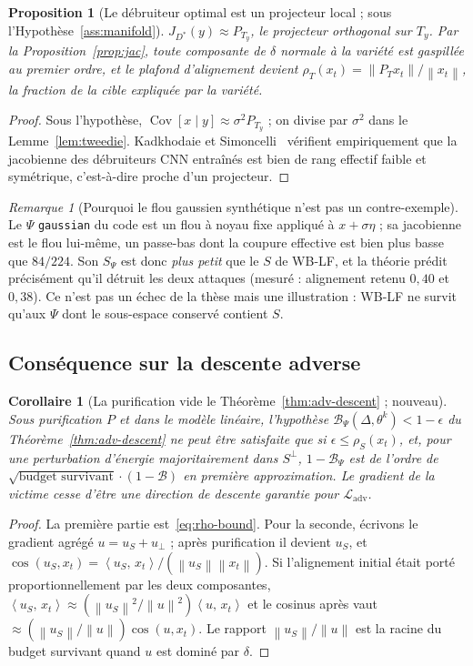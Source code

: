 \documentclass[11pt,a4paper]{article}
\theoremstyle{plain}
\newtheorem{proposition}[theorem]{Proposition}
\newtheorem{corollary}[theorem]{Corollaire}
\theoremstyle{definition}
\theoremstyle{remark}
\newtheorem{remark}[theorem]{Remarque}
\newcommand{\Ladv}{\mathcal{L}_{\mathrm{adv}}}
\newcommand{\B}{\mathcal{B}}
\newcommand{\norm}[1]{\left\lVert #1 \right\rVert}
\newcommand{\inner}[2]{\left\langle #1,\, #2 \right\rangle}
\newcommand{\xt}{x_t}
\DeclareMathOperator{\cosang}{cos}
\DeclareMathOperator{\Cov}{Cov}
\begin{document}
\begin{proposition}[Le débruiteur optimal est un projecteur local ; sous l'Hypothèse~\ref{ass:manifold}]
$J_{D^*}(y)\approx P_{T_y}$, le projecteur orthogonal sur $T_y$. Par la Proposition~\ref{prop:jac},
toute composante de $\delta$ normale à la variété est gaspillée au premier ordre, et le plafond
d'alignement devient $\rho_{T}(\xt)=\norm{P_{T}\xt}/\norm{\xt}$, la fraction de la cible
expliquée par la variété.
\end{proposition}
\begin{proof}
Sous l'hypothèse, $\Cov[x\mid y]\approx\sigma^2P_{T_y}$ ; on divise par $\sigma^2$ dans le
Lemme~\ref{lem:tweedie}. Kadkhodaie et Simoncelli~\cite{kadkhodaie2021} vérifient
empiriquement que la jacobienne des débruiteurs CNN entraînés est bien de rang effectif faible et
symétrique, c'est-à-dire proche d'un projecteur.
\end{proof}

\begin{remark}[Pourquoi le flou gaussien synthétique n'est pas un contre-exemple]
Le $\Psi$ \texttt{gaussian} du code est un flou à noyau fixe appliqué à $x+\sigma\eta$ ; sa
jacobienne est le flou lui-même, un passe-bas dont la coupure effective est bien plus basse que
$84/224$. Son $S_\Psi$ est donc \emph{plus petit} que le $S$ de WB-LF, et la théorie prédit
précisément qu'il détruit les deux attaques (mesuré : alignement retenu $0{,}40$ et $0{,}38$).
Ce n'est pas un échec de la thèse mais une illustration : WB-LF ne survit qu'aux $\Psi$ dont le
sous-espace conservé contient $S$.
\end{remark}

\subsection{Conséquence sur la descente adverse}

\begin{corollary}[La purification vide le Théorème~\ref{thm:adv-descent} ; nouveau]
Sous purification $P$ et dans le modèle linéaire, l'hypothèse $\B_\Psi(\Delta,\theta^k)<1-\epsilon$
du Théorème~\ref{thm:adv-descent} ne peut être satisfaite que si $\epsilon\le\rho_S(\xt)$, et,
pour une perturbation d'énergie majoritairement dans $S^\perp$, $1-\B_\Psi$ est de l'ordre de
$\sqrt{\text{budget survivant}}\cdot(1-\B)$ en première approximation. Le gradient de la victime
cesse d'être une direction de descente \emph{garantie} pour $\Ladv$.
\end{corollary}
\begin{proof}
La première partie est~\eqref{eq:rho-bound}. Pour la seconde, écrivons le gradient agrégé
$u=u_S+u_\perp$ ; après purification il devient $u_S$, et
$\cosang(u_S,\xt)=\inner{u_S}{\xt}/(\norm{u_S}\norm{\xt})$. Si l'alignement initial était porté
proportionnellement par les deux composantes, $\inner{u_S}{\xt}\approx(\norm{u_S}^2/\norm u^2)\inner{u}{\xt}$
et le cosinus après vaut $\approx(\norm{u_S}/\norm u)\cosang(u,\xt)$. Le rapport
$\norm{u_S}/\norm u$ est la racine du budget survivant quand $u$ est dominé par $\delta$.
\end{proof}
\end{document}
